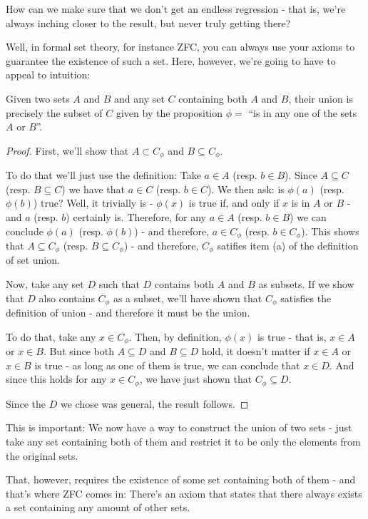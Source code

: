 How can we make sure that we don't get an endless regression - that is, we're always inching closer to the result, but never truly getting there?

Well, in formal set theory, for instance ZFC, you can always use your axioms to guarantee the existence of such a set. Here, however, we're going to have to appeal to intuition:

\begin{prop}
	Given two sets $A$ and $B$ and any set $C$ containing both $A$ and $B$, their union is precisely the subset of $C$ given by the proposition $\phi=$ ``is in any one of the sets $A$ or $B$''.
\end{prop}
\begin{proof}
	First, we'll show that $A\subset C_\phi$ and $B\subseteq C_\phi$.
	
	To do that we'll just use the definition: Take $a\in A$ (resp. $b\in B$). Since $A\subseteq C$ (resp. $B\subseteq C$) we have that $a\in C$ (resp. $b\in C$). We then ask: is $\phi(a)$ (resp. $\phi(b)$) true? Well, it trivially is - $\phi(x)$ is true if, and only if $x$ is in $A$ or $B$ - and $a$ (resp. $b$) certainly is. Therefore, for any $a\in A$ (resp. $b\in B$) we can conclude $\phi(a)$ (resp. $\phi(b)$) - and therefore, $a\in C_\phi$ (resp. $b\in C_\phi$). This shows that $A\subseteq C_\phi$ (resp. $B\subseteq C_\phi$) - and therefore, $C_\phi$ satifies item (a) of the definition of set union.
	
	Now, take any set $D$ such that $D$ contains both $A$ and $B$ as subsets. If we show that $D$ also contains $C_\phi$ as a subset, we'll have shown that $C_\phi$ satisfies the definition of union - and therefore it must be the union.
	
	To do that, take any $x\in C_\phi$. Then, by definition, $\phi(x)$ is true - that is, $x\in A$ or $x\in B$. But since both $A\subseteq D$ and $B\subseteq D$ hold, it doesn't matter if $x\in A$ or $x\in B$ is true - as long as one of them is true, we can conclude that $x\in D$. And since this holds for any $x\in C_\phi$, we have just shown that $C_\phi\subseteq D$.
	
	Since the $D$ we chose was general, the result follows.	
\end{proof}

This is important: We now have a way to construct the union of two sets - just take any set containing both of them and restrict it to be only the elements from the original sets.

That, however, requires the existence of some set containing both of them - and that's where ZFC comes in: There's an axiom that states that there always exists a set containing any amount of other sets.

